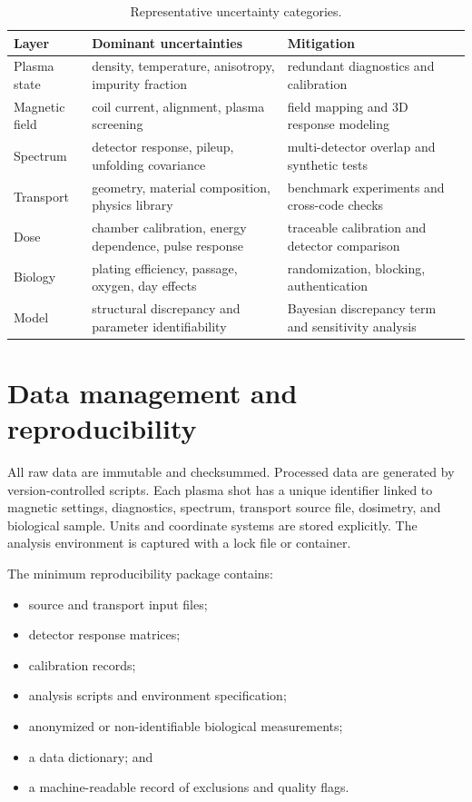 \begin{table}[H]
\centering
\caption{Representative uncertainty categories.}
\label{tab:uncertainties}
\begin{tabularx}{\textwidth}{lXX}
\toprule
Layer & Dominant uncertainties & Mitigation \\
\midrule
Plasma state & density, temperature, anisotropy, impurity fraction & redundant diagnostics and calibration \\
Magnetic field & coil current, alignment, plasma screening & field mapping and 3D response modeling \\
Spectrum & detector response, pileup, unfolding covariance & multi-detector overlap and synthetic tests \\
Transport & geometry, material composition, physics library & benchmark experiments and cross-code checks \\
Dose & chamber calibration, energy dependence, pulse response & traceable calibration and detector comparison \\
Biology & plating efficiency, passage, oxygen, day effects & randomization, blocking, authentication \\
Model & structural discrepancy and parameter identifiability & Bayesian discrepancy term and sensitivity analysis \\
\bottomrule
\end{tabularx}
\end{table}

\section{Data management and reproducibility}

All raw data are immutable and checksummed. Processed data are generated by version-controlled scripts. Each plasma shot has a unique identifier linked to magnetic settings, diagnostics, spectrum, transport source file, dosimetry, and biological sample. Units and coordinate systems are stored explicitly. The analysis environment is captured with a lock file or container.

The minimum reproducibility package contains:
\begin{itemize}
\item source and transport input files;
\item detector response matrices;
\item calibration records;
\item analysis scripts and environment specification;
\item anonymized or non-identifiable biological measurements;
\item a data dictionary; and
\item a machine-readable record of exclusions and quality flags.
\end{itemize}

